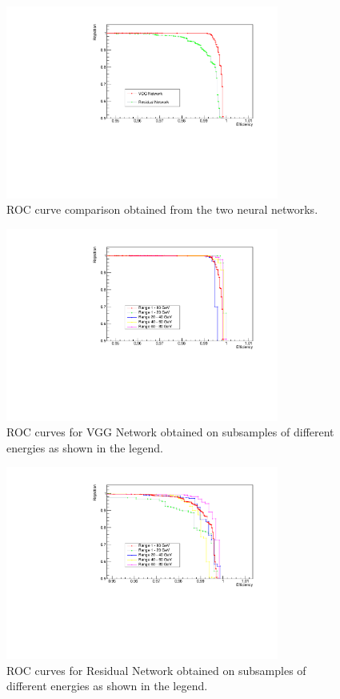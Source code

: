 \begin{figure}
	\centering
	\includegraphics[width=0.8\textwidth]{IMG/Cap6/ROC_VGG_Res_zoom.pdf}
	\caption{ROC curve comparison obtained from the two neural networks.}
	\label{fig:ROC}
\end{figure}

\begin{figure}
	\centering
	\includegraphics[width=0.8\textwidth]{IMG/Cap6/ROC_VGG_sub_zoom.pdf}
	\caption{ROC curves for VGG Network obtained on subsamples of different energies as shown in the legend.}
	\label{fig:ROC_VGG_sub}
\end{figure}

\begin{figure}
	\centering
	\includegraphics[width=0.8\textwidth]{IMG/Cap6/ROC_Res_sub_zoom.pdf}
	\caption{ROC curves for Residual Network obtained on subsamples of different energies as shown in the legend.}
	\label{fig:ROC_Res_sub}
\end{figure}
